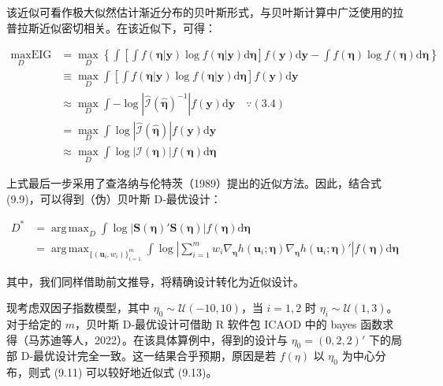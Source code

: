 \documentclass{ctexart}
\DeclareMathOperator*{\argmax}{arg\,max}
\begin{document}
该近似可看作极大似然估计渐近分布的贝叶斯形式，与贝叶斯计算中广泛使用的拉普拉斯近似密切相关。在该近似下，可得：

\begin{align*}
\max_{D}\text{EIG}&=\max_{D}\left\{\int\left[\int f(\boldsymbol{\eta}|\boldsymbol{y})\log f(\boldsymbol{\eta}|\boldsymbol{y})\mathrm{d}\boldsymbol{\eta}\right]f(\boldsymbol{y})\mathrm{d}\boldsymbol{y}-\int f(\boldsymbol{\eta})\log f(\boldsymbol{\eta})\mathrm{d}\boldsymbol{\eta}\right\}\\
&\equiv\max_{D}\int\left[\int f(\boldsymbol{\eta}|\boldsymbol{y})\log f(\boldsymbol{\eta}|\boldsymbol{y})\mathrm{d}\boldsymbol{\eta}\right]f(\boldsymbol{y})\mathrm{d}\boldsymbol{y}\\
&\approx\max_{D}\int-\log\left|\widehat{\mathcal{I}}(\widehat{\boldsymbol{\eta}})^{-1}\right|f(\boldsymbol{y})\mathrm{d}\boldsymbol{y}\quad\because(3.4)\\
&=\max_{D}\int\log\left|\widehat{\mathcal{I}}(\widehat{\boldsymbol{\eta}})\right|f(\boldsymbol{y})\mathrm{d}\boldsymbol{y}\\
&\approx\max_{D}\int\log\left|\mathcal{I}(\boldsymbol{\eta})\right|f(\boldsymbol{\eta})\mathrm{d}\boldsymbol{\eta}
\end{align*}

上式最后一步采用了查洛纳与伦特茨（1989）提出的近似方法。因此，结合式 (9.9)，可以得到（伪）贝叶斯 D‑最优设计：

\begin{align*}
D^*&=\argmax_{D}\int\log\left|\boldsymbol{S}(\boldsymbol{\eta})'\boldsymbol{S}(\boldsymbol{\eta})\right|f(\boldsymbol{\eta})\mathrm{d}\boldsymbol{\eta}\\
&=\argmax_{\{(\boldsymbol{u}_i,w_i)\}_{i=1}^{m}}\int\log\left|\sum_{i=1}^{m}w_i\nabla_{\boldsymbol{\eta}}h(\boldsymbol{u}_i;\boldsymbol{\eta})\nabla_{\boldsymbol{\eta}}h(\boldsymbol{u}_i;\boldsymbol{\eta})'\right|f(\boldsymbol{\eta})\mathrm{d}\boldsymbol{\eta}
\tag{9.13}
\end{align*}

其中，我们同样借助前文推导，将精确设计转化为近似设计。

现考虑双因子指数模型，其中 $\eta_0\sim\mathcal{U}(-10,10)$，当 $i=1,2$ 时 $\eta_i\sim\mathcal{U}(1,3)$。对于给定的 $m$，贝叶斯 D‑最优设计可借助 R 软件包 ICAOD 中的 bayes 函数求得（马苏迪等人，2022）。在该具体算例中，得到的设计与 $\eta_0=(0,2,2)'$ 下的局部 D‑最优设计完全一致。这一结果合乎预期，原因是若 $f(\eta)$ 以 $\eta_0$ 为中心分布，则式 (9.11) 可以较好地近似式 (9.13)。
\end{document}
